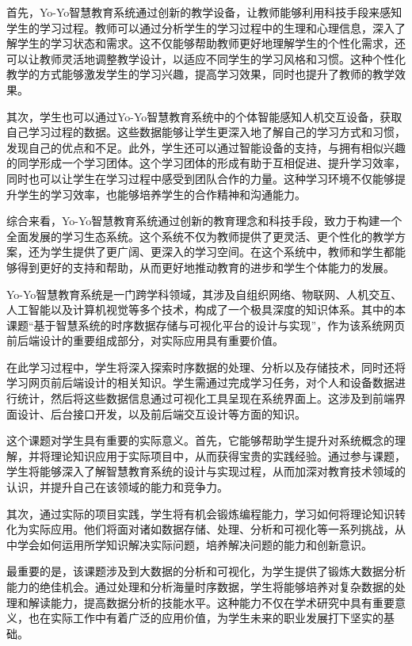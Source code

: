 \documentclass[oneside]{xduugthesis}
\begin{document}
首先，Yo-Yo智慧教育系统通过创新的教学设备，让教师能够利用科技手段来感知学生的学习过程。教师可以通过分析学生的学习过程中的生理和心理信息，深入了解学生的学习状态和需求。这不仅能够帮助教师更好地理解学生的个性化需求，还可以让教师灵活地调整教学设计，以适应不同学生的学习风格和习惯。这种个性化教学的方式能够激发学生的学习兴趣，提高学习效果，同时也提升了教师的教学效果。

其次，学生也可以通过Yo-Yo智慧教育系统中的个体智能感知人机交互设备，获取自己学习过程的数据。这些数据能够让学生更深入地了解自己的学习方式和习惯，发现自己的优点和不足。此外，学生还可以通过智能设备的支持，与拥有相似兴趣的同学形成一个学习团体。这个学习团体的形成有助于互相促进、提升学习效率，同时也可以让学生在学习过程中感受到团队合作的力量。这种学习环境不仅能够提升学生的学习效率，也能够培养学生的合作精神和沟通能力。

综合来看，Yo-Yo智慧教育系统通过创新的教育理念和科技手段，致力于构建一个全面发展的学习生态系统。这个系统不仅为教师提供了更灵活、更个性化的教学方案，还为学生提供了更广阔、更深入的学习空间。在这个系统中，教师和学生都能够得到更好的支持和帮助，从而更好地推动教育的进步和学生个体能力的发展。

Yo-Yo智慧教育系统是一门跨学科领域，其涉及自组织网络、物联网、人机交互、人工智能以及计算机视觉等多个技术，构成了一个极具深度的知识体系。其中的本课题“基于智慧系统的时序数据存储与可视化平台的设计与实现”，作为该系统网页前后端设计的重要组成部分，对实际应用具有重要价值。

在此学习过程中，学生将深入探索时序数据的处理、分析以及存储技术，同时还将学习网页前后端设计的相关知识。学生需通过完成学习任务，对个人和设备数据进行统计，然后将这些数据信息通过可视化工具呈现在系统界面上。这涉及到前端界面设计、后台接口开发，以及前后端交互设计等方面的知识。

这个课题对学生具有重要的实际意义。首先，它能够帮助学生提升对系统概念的理解，并将理论知识应用于实际项目中，从而获得宝贵的实践经验。通过参与课题，学生将能够深入了解智慧教育系统的设计与实现过程，从而加深对教育技术领域的认识，并提升自己在该领域的能力和竞争力。

其次，通过实际的项目实践，学生将有机会锻炼编程能力，学习如何将理论知识转化为实际应用。他们将面对诸如数据存储、处理、分析和可视化等一系列挑战，从中学会如何运用所学知识解决实际问题，培养解决问题的能力和创新意识。

最重要的是，该课题涉及到大数据的分析和可视化，为学生提供了锻炼大数据分析能力的绝佳机会。通过处理和分析海量时序数据，学生将能够培养对复杂数据的处理和解读能力，提高数据分析的技能水平。这种能力不仅在学术研究中具有重要意义，也在实际工作中有着广泛的应用价值，为学生未来的职业发展打下坚实的基础。
\end{document}
